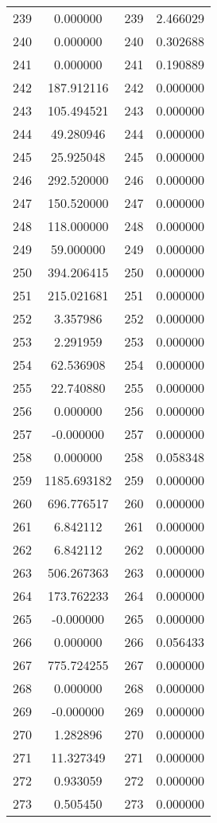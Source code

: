 \documentclass[12pt]{article}
\begin{document}
\begin{longtable}{@{}cccc@{}}
239 & 0.000000 & 239 & 2.466029 \\
240 & 0.000000 & 240 & 0.302688 \\
241 & 0.000000 & 241 & 0.190889 \\
242 & 187.912116 & 242 & 0.000000 \\
243 & 105.494521 & 243 & 0.000000 \\
244 & 49.280946 & 244 & 0.000000 \\
245 & 25.925048 & 245 & 0.000000 \\
246 & 292.520000 & 246 & 0.000000 \\
247 & 150.520000 & 247 & 0.000000 \\
248 & 118.000000 & 248 & 0.000000 \\
249 & 59.000000 & 249 & 0.000000 \\
250 & 394.206415 & 250 & 0.000000 \\
251 & 215.021681 & 251 & 0.000000 \\
252 & 3.357986 & 252 & 0.000000 \\
253 & 2.291959 & 253 & 0.000000 \\
254 & 62.536908 & 254 & 0.000000 \\
255 & 22.740880 & 255 & 0.000000 \\
256 & 0.000000 & 256 & 0.000000 \\
257 & -0.000000 & 257 & 0.000000 \\
258 & 0.000000 & 258 & 0.058348 \\
259 & 1185.693182 & 259 & 0.000000 \\
260 & 696.776517 & 260 & 0.000000 \\
261 & 6.842112 & 261 & 0.000000 \\
262 & 6.842112 & 262 & 0.000000 \\
263 & 506.267363 & 263 & 0.000000 \\
264 & 173.762233 & 264 & 0.000000 \\
265 & -0.000000 & 265 & 0.000000 \\
266 & 0.000000 & 266 & 0.056433 \\
267 & 775.724255 & 267 & 0.000000 \\
268 & 0.000000 & 268 & 0.000000 \\
269 & -0.000000 & 269 & 0.000000 \\
270 & 1.282896 & 270 & 0.000000 \\
271 & 11.327349 & 271 & 0.000000 \\
272 & 0.933059 & 272 & 0.000000 \\
273 & 0.505450 & 273 & 0.000000 \\

\end{longtable}
\end{document}
